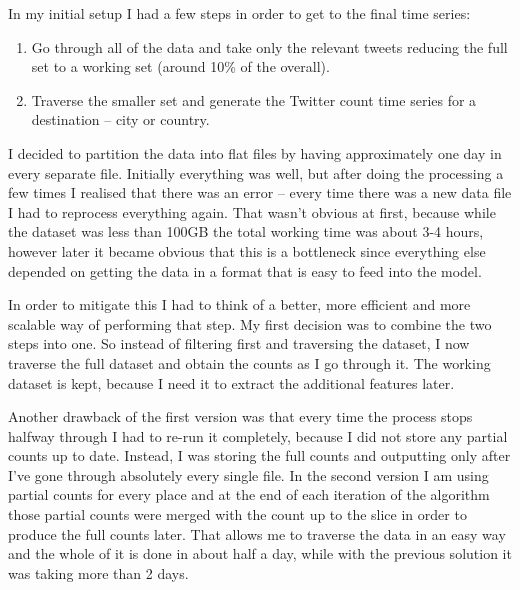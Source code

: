 \documentclass[minf,twoside,singlespacing,parskip,frontabs,notimes,11pt]{infthesis}
\begin{document}
%


In my initial setup I had a few steps in order to get to the final time series:
\begin{enumerate}
\item Go through all of the data and take only the relevant tweets reducing the full set to a working set (around 10\% of the overall).
\item Traverse the smaller set and generate the Twitter count time series for a destination -- city or country. 
\end{enumerate}

I decided to partition the data into flat files by having approximately one day in every separate file. Initially everything was well, but after doing the processing a few times I realised that there was an error -- every time there was a new data file I had to reprocess everything again. That wasn't obvious at first, because while the dataset was less than 100GB the total working time was about 3-4 hours, however later it became obvious that this is a bottleneck since everything else depended on getting the data in a format that is easy to feed into the model.

In order to mitigate this I had to think of a better, more efficient and more scalable way of performing that step. My first decision was to combine the two steps into one. So instead of filtering first and traversing the dataset, I now traverse the full dataset and obtain the counts as I go through it. The working dataset is kept, because I need it to extract the additional features later. 

Another drawback of the first version was that every time the process stops halfway through I had to re-run it completely, because I did not store any partial counts up to date. Instead, I was storing the full counts and outputting only after I've gone through absolutely every single file. In the second version I am using partial counts for every place and at the end of each iteration of the algorithm those partial counts were merged with the count up to the slice in order to produce the full counts later. That allows me to traverse the data in an easy way and the whole of it is done in about half a day, while with the previous solution it was taking more than 2 days.
\end{document}
